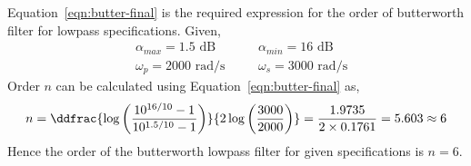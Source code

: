 Equation~\ref{eqn:butter-final} is the required expression for the order of butterworth filter for lowpass specifications.
Given,
\begin{equation*}
   \begin{aligned}
      & \alpha_{max}=1.5 \text{ dB} \quad && \alpha_{min}=16 \text{ dB}\\
      & \omega_p=2000 \text{ rad/s} \quad && \omega_s=3000 \text{ rad/s}
   \end{aligned}
\end{equation*}
Order $n$ can be calculated using Equation~\ref{eqn:butter-final} as,
\begin{equation*}
   \begin{aligned}
      n=\ddfrac{\log{\left(\frac{10^{16/10} -1}{10^{1.5/10} -1}\right)}}{2\log{\left(\frac{3000}{2000}\right)}}=\frac{1.9735}{2\times0.1761}=5.603\approx 6
   \end{aligned}
\end{equation*}
Hence the order of the butterworth lowpass filter for given specifications is $n=6$.



